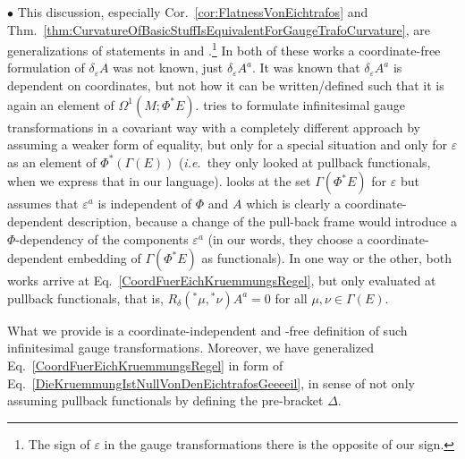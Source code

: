 \begin{remark}\label{RemarkUeberNablaRhoCurvatureForGauegTrafo}
\leavevmode\newline
\indent $\bullet$ This discussion, especially Cor.~\ref{cor:FlatnessVonEichtrafos} and Thm.~\ref{thm:CurvatureOfBasicStuffIsEquivalentForGaugeTrafoCurvature}, are generalizations of statements in \cite[especially Prop.~8 and Thm.~1]{EichtrafoKruemmungUrspruenglich} and \cite[especially Eq.~9, 10 and 11; there the $S$ denotes the basic curvature]{mayerlieAuchEichtrafoStuff}.\footnote{The sign of $\varepsilon$ in the gauge transformations there is the opposite of our sign.} In both of these works a coordinate-free formulation of $\delta_\varepsilon A$ was not known, just $\delta_\varepsilon A^a$. It was known that $\delta_\varepsilon A^a$ is dependent on coordinates, but not how it can be written/defined such that it is again an element of $\Omega^1(M; \Phi^*E)$. \cite{EichtrafoKruemmungUrspruenglich} tries to formulate infinitesimal gauge transformations in a covariant way with a completely different approach by assuming a weaker form of equality, but only for a special situation and only for $\varepsilon$ as an element of $\Phi^*(\Gamma(E))$ (\textit{i.e.}~they only looked at pullback functionals, when we express that in our language). \cite{mayerlieAuchEichtrafoStuff} looks at the set $\Gamma(\Phi^*E)$ for $\varepsilon$ but assumes that $\varepsilon^a$ is independent of $\Phi$ and $A$ which is clearly a coordinate-dependent description, because a change of the pull-back frame would introduce a $\Phi$-dependency of the components $\varepsilon^a$ (in our words, they choose a coordinate-dependent embedding of $\Gamma(\Phi^*E)$ as functionals). In one way or the other, both works arrive at Eq.~\eqref{CoordFuerEichKruemmungsRegel}, but only evaluated at pullback functionals, that is, $R_\delta({}^*\mu, {}^*\nu)A^a=0$ for all $\mu, \nu \in \Gamma(E)$.

What we provide is a coordinate-independent and -free definition of such infinitesimal gauge transformations. Moreover, we have generalized Eq.~\eqref{CoordFuerEichKruemmungsRegel} in form of Eq.~\eqref{DieKruemmungIstNullVonDenEichtrafosGeeeeil}, in sense of not only assuming pullback functionals by defining the pre-bracket $\Delta$.


\end{remark}
